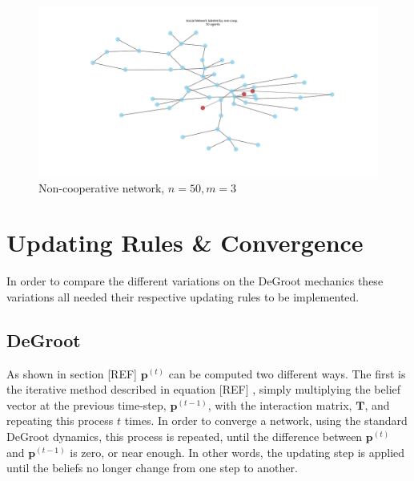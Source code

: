 \documentclass{article}
\newcommand{\T}{\textbf{T}}
\begin{document}
\begin{center}
    \begin{figure}[!htbp]
        \centering
        \includegraphics[width=1\textwidth]{ThesisKI/Images/NonCoopGraph.png}
        \caption{Non-cooperative network, $n=50, m=3$}
        \label{network:noncoop}
    \end{figure}
\end{center}


\newpage


\section{Updating Rules \& Convergence}

In order to compare the different variations on the DeGroot mechanics these variations all needed their respective updating rules to be implemented.

\subsection{DeGroot}

As shown in section [REF] $\textbf{p}^{(t)}$ can be computed two different ways. The first is the iterative method described in equation [REF] , simply multiplying the belief vector at the previous time-step, $\textbf{p}^{(t-1)}$, with the interaction matrix, $\T$, and repeating this process $t$ times. In order to converge a network, using the standard DeGroot dynamics, this process is repeated, until the difference between $\textbf{p}^{(t)}$ and $\textbf{p}^{(t-1)}$ is zero, or near enough. In other words, the updating step is applied until the beliefs no longer change from one step to another.
\end{document}
